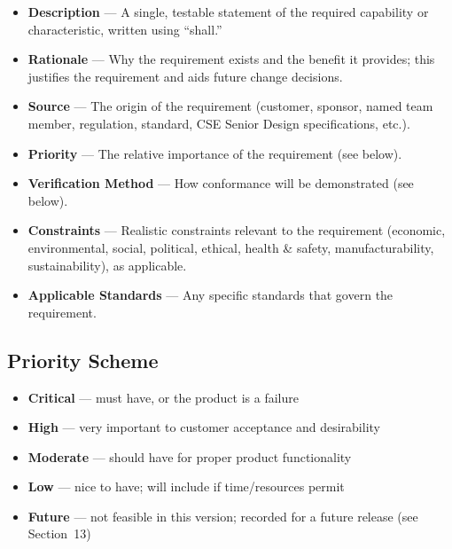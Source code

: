 \begin{itemize}
  \item \textbf{Description} --- A single, testable statement of the required capability or characteristic, written using ``shall.''
  \item \textbf{Rationale} --- Why the requirement exists and the benefit it provides; this justifies the requirement and aids future change decisions.
  \item \textbf{Source} --- The origin of the requirement (customer, sponsor, named team member, regulation, standard, CSE Senior Design specifications, etc.).
  \item \textbf{Priority} --- The relative importance of the requirement (see below).
  \item \textbf{Verification Method} --- How conformance will be demonstrated (see below).
  \item \textbf{Constraints} --- Realistic constraints relevant to the requirement (economic, environmental, social, political, ethical, health \& safety, manufacturability, sustainability), as applicable.
  \item \textbf{Applicable Standards} --- Any specific standards that govern the requirement.
\end{itemize}

\subsection{Priority Scheme}
\begin{itemize}
\item \textbf{Critical} --- must have, or the product is a failure
\item \textbf{High} --- very important to customer acceptance and desirability
\item \textbf{Moderate} --- should have for proper product functionality
\item \textbf{Low} --- nice to have; will include if time/resources permit
\item \textbf{Future} --- not feasible in this version; recorded for a future release (see Section~13)
\end{itemize}

